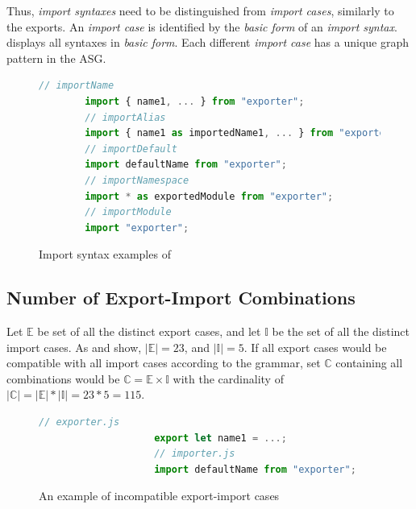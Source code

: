 Thus, \emph{import syntaxes} need to be distinguished from \emph{import cases}, similarly to the exports. An \emph{import case} is identified by the \emph{basic form} of an \emph{import syntax}.  displays all syntaxes in \emph{basic form}. Each different \emph{import case} has a unique graph pattern in the ASG.

\begin{figure}[!htb]
	\begin{lstlisting}[language=JavaScript]
		// importName
		import { name1, ... } from "exporter";
		// importAlias
		import { name1 as importedName1, ... } from "exporter";
		// importDefault
		import defaultName from "exporter";
		// importNamespace
		import * as exportedModule from "exporter";
		// importModule
		import "exporter";
	\end{lstlisting}
  \caption{Import syntax examples of }
  \label{fig:import-syntaxes}
\end{figure}


\subsection{Number of Export-Import Combinations}

Let $\mathbb{E}$ be set of all the distinct export cases, and let $\mathbb{I}$ be the set of all the distinct import cases. As  and  show, $|\mathbb{E}| = 23$, and $|\mathbb{I}| = 5$. If all export cases would be compatible with all import cases according to the \es grammar, set $\mathbb{C}$ containing all combinations would be $\mathbb{C} = \mathbb{E} \times \mathbb{I}$ with the cardinality of $|\mathbb{C}| = |\mathbb{E}| * |\mathbb{I}| = 23 * 5 = 115$.

\begin{figure}[!htb]
	\begin{lstlisting}[language=JavaScript]
					// exporter.js
					export let name1 = ...;
					// importer.js
					import defaultName from "exporter";
	\end{lstlisting}
  \caption{An example of incompatible export-import cases}
  \label{fig:incompatible-export-import-example}
\end{figure}

